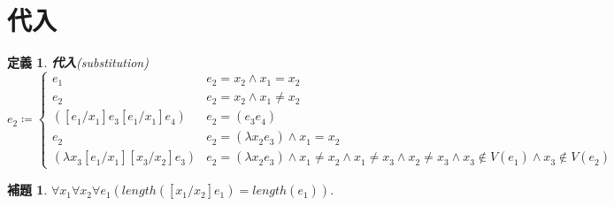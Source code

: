 \documentclass{ltjsbook}%
\newtheorem{lemma}{補題}[section]%
\newtheorem{definition}{定義}[section]%
\newcommand\term[2]{\textbf{#1}{(\textit{#2})}}%
\begin{document}
\section{代入}%
\label{untyped:subst}%
\begin{definition}%
\term{代入}{substitution}%
\begin{equation}%
  [\mathit{e}_1^{}/\mathit{x}_1^{}]\mathit{e}_2^{} \coloneqq \begin{cases}%
    \mathit{e}_1^{} & \mathit{e}_2^{} = \mathit{x}_2^{}\land\mathit{x}_1^{}=\mathit{x}_2^{}\\%
    \mathit{e}_2^{}%
    & \mathit{e}_2^{} = \mathit{x}_2^{}\land\mathit{x}_1^{}\neq\mathit{x}_2^{}\\%
    ([\mathit{e}_1^{}/\mathit{x}_1^{}]\mathit{e}_3^{}%
      [\mathit{e}_1^{}/\mathit{x}_1^{}]\mathit{e}_4^{})%
    & \mathit{e}_2^{} = (\mathit{e}_3^{}\mathit{e}_4^{})\\%
    \mathit{e}_2^{}%
    & \mathit{e}_2^{} = (\lambda\mathit{x}_2^{}\mathit{e}_3^{})%
    \land \mathit{x}_1^{} = \mathit{x}_2^{}\\%
    (\lambda\mathit{x}_3^{}[\mathit{e}_1^{}/\mathit{x}_1^{}][\mathit{x}_3^{}/\mathit{x}_2^{}]%
    \mathit{e}_3^{})%
    & \mathit{e}_2^{} = (\lambda\mathit{x}_2^{}\mathit{e}_3^{})%
    \land \mathit{x}_1^{} \neq \mathit{x}_2^{}%
    \land\mathit{x}_1^{}\neq\mathit{x}_3^{}%
    \land\mathit{x}_2^{}\neq\mathit{x}_3^{}%
    \land\mathit{x}_3^{}\not\in V(\mathit{e}_1^{})%
    \land\mathit{x}_3^{}\not\in V(\mathit{e}_2^{})%
  \end{cases}%
\end{equation}%
\end{definition}%
\begin{lemma}%
  \label{lemma:subst_len}%
  $\forall\mathit{x}_1^{}\forall\mathit{x}_2^{}\forall\mathit{e}_1^{}%
  (length([\mathit{x}_1^{}/\mathit{x}_2^{}]\mathit{e}_1^{})=length(\mathit{e}_1^{}))$.%
\end{lemma}%
\end{document}
